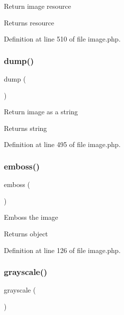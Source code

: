 Return image resource \begin{DoxyReturn}{Returns}
resource 
\end{DoxyReturn}


Definition at line 510 of file image.\+php.

\hypertarget{class_image_a5bf63e4ac70cfd9d97e3f2eab936ec8b}{}\label{class_image_a5bf63e4ac70cfd9d97e3f2eab936ec8b} 
\subsubsection{\texorpdfstring{dump()}{dump()}}
{\footnotesize\ttfamily dump (\begin{DoxyParamCaption}{ }\end{DoxyParamCaption})}

Return image as a string \begin{DoxyReturn}{Returns}
string 
\end{DoxyReturn}


Definition at line 495 of file image.\+php.

\hypertarget{class_image_aabc8c1473621bfe3e064dd0a756c935e}{}\label{class_image_aabc8c1473621bfe3e064dd0a756c935e} 
\subsubsection{\texorpdfstring{emboss()}{emboss()}}
{\footnotesize\ttfamily emboss (\begin{DoxyParamCaption}{ }\end{DoxyParamCaption})}

Emboss the image \begin{DoxyReturn}{Returns}
object 
\end{DoxyReturn}


Definition at line 126 of file image.\+php.

\hypertarget{class_image_acc92bb7ca13df725e80732ca8181a0c2}{}\label{class_image_acc92bb7ca13df725e80732ca8181a0c2} 
\subsubsection{\texorpdfstring{grayscale()}{grayscale()}}
{\footnotesize\ttfamily grayscale (\begin{DoxyParamCaption}{ }\end{DoxyParamCaption})}

